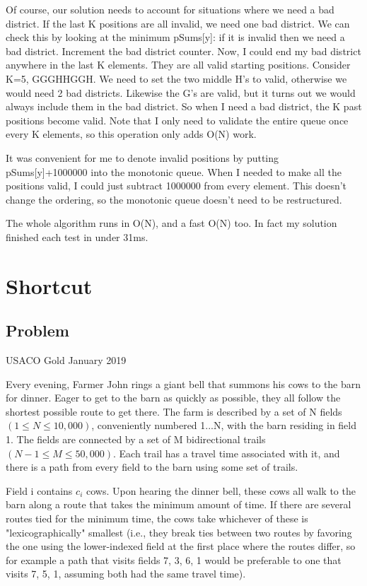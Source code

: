 \documentclass{article}
\begin{document}
Of course, our solution needs to account for situations where we need a bad district. If the last K positions are all invalid, we need one bad district. We can check this by looking at the minimum pSums[y]: if it is invalid then we need a bad district. Increment the bad district counter. Now, I could end my bad district anywhere in the last K elements. They are all valid starting positions. Consider K=5, GGGHHGGH. We need to set the two middle H's to valid, otherwise we would need 2 bad districts. Likewise the G's are valid, but it turns out we would always include them in the bad district. So when I need a bad district, the K past positions become valid. Note that I only need to validate the entire queue once every K elements, so this operation only adds O(N) work.

It was convenient for me to denote invalid positions by putting pSums[y]+1000000 into the monotonic queue. When I needed to make all the positions valid, I could just subtract 1000000 from every element. This doesn't change the ordering, so the monotonic queue doesn't need to be restructured.

The whole algorithm runs in O(N), and a fast O(N) too. In fact my solution finished each test in under 31ms.

\section{Shortcut}
\subsection{Problem}
USACO Gold January 2019

Every evening, Farmer John rings a giant bell that summons his cows to the barn for dinner. Eager to get to the barn as quickly as possible, they all follow the shortest possible route to get there.
The farm is described by a set of N fields $(1\leq N\leq10,000)$, conveniently numbered 1...N, with the barn residing in field 1. The fields are connected by a set of M bidirectional trails $(N-1\leq M\leq 50,000)$. Each trail has a travel time associated with it, and there is a path from every field to the barn using some set of trails.

Field i contains $c_i$ cows. Upon hearing the dinner bell, these cows all walk to the barn along a route that takes the minimum amount of time. If there are several routes tied for the minimum time, the cows take whichever of these is "lexicographically" smallest (i.e., they break ties between two routes by favoring the one using the lower-indexed field at the first place where the routes differ, so for example a path that visits fields 7, 3, 6, 1 would be preferable to one that visits 7, 5, 1, assuming both had the same travel time).
\end{document}
